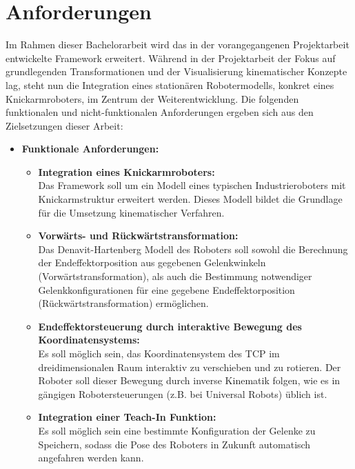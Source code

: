\section{Anforderungen}
Im Rahmen dieser Bachelorarbeit wird das in der vorangegangenen Projektarbeit entwickelte Framework erweitert.
Während in der Projektarbeit der Fokus auf grundlegenden Transformationen und der Visualisierung kinematischer Konzepte lag,
steht nun die Integration eines stationären Robotermodells, konkret eines Knickarmroboters, im Zentrum der Weiterentwicklung.
Die folgenden funktionalen und nicht-funktionalen Anforderungen ergeben sich aus den Zielsetzungen dieser Arbeit:

\begin{itemize}
    \item \textbf{Funktionale Anforderungen:}
        \begin{itemize}
        \item \textbf{Integration eines Knickarmroboters:} \\
        Das Framework soll um ein Modell eines typischen Industrieroboters mit Knickarmstruktur erweitert werden. Dieses Modell bildet die Grundlage für die Umsetzung kinematischer Verfahren.

        \item \textbf{Vorwärts- und Rückwärtstransformation:} \\
        Das Denavit-Hartenberg Modell des Roboters soll sowohl die Berechnung der Endeffektorposition aus gegebenen Gelenkwinkeln (Vorwärtstransformation), als auch die Bestimmung notwendiger Gelenkkonfigurationen für eine gegebene Endeffektorposition (Rückwärtstransformation) ermöglichen.
        

        \item \textbf{Endeffektorsteuerung durch interaktive Bewegung des Koordinatensystems:} \\
        Es soll möglich sein, das Koordinatensystem des TCP im dreidimensionalen Raum interaktiv zu verschieben und zu rotieren.
        Der Roboter soll dieser Bewegung durch inverse Kinematik folgen, wie es in gängigen Robotersteuerungen (z.B. bei Universal Robots) üblich ist.
        
        \item \textbf{Integration einer Teach-In Funktion:} \\
        Es soll möglich sein eine bestimmte Konfiguration der Gelenke zu Speichern, sodass die Pose des Roboters in Zukunft automatisch angefahren werden kann.


\end{itemize}
\end{itemize}
